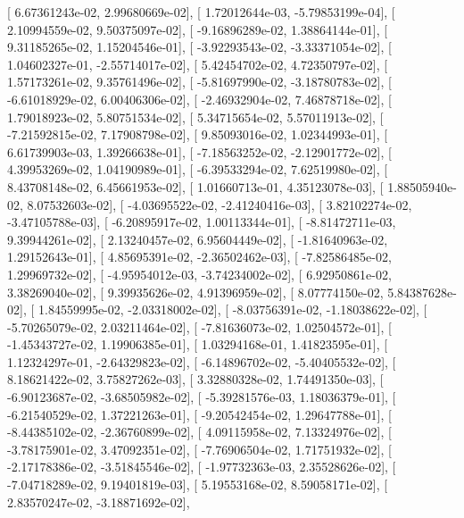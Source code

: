 \documentclass{article}
\begin{document}
       [  6.67361243e-02,   2.99680669e-02],
       [  1.72012644e-03,  -5.79853199e-04],
       [  2.10994559e-02,   9.50375097e-02],
       [ -9.16896289e-02,   1.38864144e-01],
       [  9.31185265e-02,   1.15204546e-01],
       [ -3.92293543e-02,  -3.33371054e-02],
       [  1.04602327e-01,  -2.55714017e-02],
       [  5.42454702e-02,   4.72350797e-02],
       [  1.57173261e-02,   9.35761496e-02],
       [ -5.81697990e-02,  -3.18780783e-02],
       [ -6.61018929e-02,   6.00406306e-02],
       [ -2.46932904e-02,   7.46878718e-02],
       [  1.79018923e-02,   5.80751534e-02],
       [  5.34715654e-02,   5.57011913e-02],
       [ -7.21592815e-02,   7.17908798e-02],
       [  9.85093016e-02,   1.02344993e-01],
       [  6.61739903e-03,   1.39266638e-01],
       [ -7.18563252e-02,  -2.12901772e-02],
       [  4.39953269e-02,   1.04190989e-01],
       [ -6.39533294e-02,   7.62519980e-02],
       [  8.43708148e-02,   6.45661953e-02],
       [  1.01660713e-01,   4.35123078e-03],
       [  1.88505940e-02,   8.07532603e-02],
       [ -4.03695522e-02,  -2.41240416e-03],
       [  3.82102274e-02,  -3.47105788e-03],
       [ -6.20895917e-02,   1.00113344e-01],
       [ -8.81472711e-03,   9.39944261e-02],
       [  2.13240457e-02,   6.95604449e-02],
       [ -1.81640963e-02,   1.29152643e-01],
       [  4.85695391e-02,  -2.36502462e-03],
       [ -7.82586485e-02,   1.29969732e-02],
       [ -4.95954012e-03,  -3.74234002e-02],
       [  6.92950861e-02,   3.38269040e-02],
       [  9.39935626e-02,   4.91396959e-02],
       [  8.07774150e-02,   5.84387628e-02],
       [  1.84559995e-02,  -2.03318002e-02],
       [ -8.03756391e-02,  -1.18038622e-02],
       [ -5.70265079e-02,   2.03211464e-02],
       [ -7.81636073e-02,   1.02504572e-01],
       [ -1.45343727e-02,   1.19906385e-01],
       [  1.03294168e-01,   1.41823595e-01],
       [  1.12324297e-01,  -2.64329823e-02],
       [ -6.14896702e-02,  -5.40405532e-02],
       [  8.18621422e-02,   3.75827262e-03],
       [  3.32880328e-02,   1.74491350e-03],
       [ -6.90123687e-02,  -3.68505982e-02],
       [ -5.39281576e-03,   1.18036379e-01],
       [ -6.21540529e-02,   1.37221263e-01],
       [ -9.20542454e-02,   1.29647788e-01],
       [ -8.44385102e-02,  -2.36760899e-02],
       [  4.09115958e-02,   7.13324976e-02],
       [ -3.78175901e-02,   3.47092351e-02],
       [ -7.76906504e-02,   1.71751932e-02],
       [ -2.17178386e-02,  -3.51845546e-02],
       [ -1.97732363e-03,   2.35528626e-02],
       [ -7.04718289e-02,   9.19401819e-03],
       [  5.19553168e-02,   8.59058171e-02],
       [  2.83570247e-02,  -3.18871692e-02],
\end{document}
